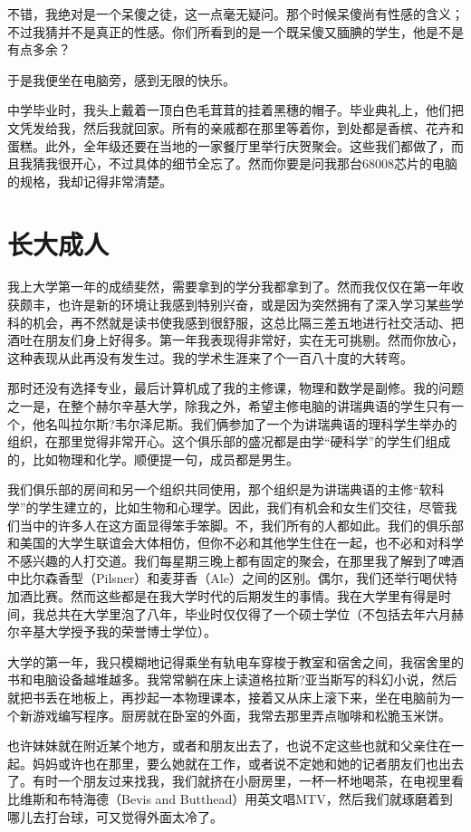 不错，我绝对是一个呆傻之徒，这一点毫无疑问。那个时候呆傻尚有性感的含义；不过我猜并不是真正的性感。你们所看到的是一个既呆傻又腼腆的学生，他是不是有点多余？

于是我便坐在电脑旁，感到无限的快乐。

中学毕业时，我头上戴着一顶白色毛茸茸的挂着黑穗的帽子。毕业典礼上，他们把文凭发给我，然后我就回家。所有的亲戚都在那里等着你，到处都是香槟、花卉和蛋糕。此外，全年级还要在当地的一家餐厅里举行庆贺聚会。这些我们都做了，而且我猜我很开心，不过具体的细节全忘了。然而你要是问我那台68008芯片的电脑的规格，我却记得非常清楚。

 
\section{长大成人}

我上大学第一年的成绩斐然，需要拿到的学分我都拿到了。然而我仅仅在第一年收获颇丰，也许是新的环境让我感到特别兴奋，或是因为突然拥有了深入学习某些学科的机会，再不然就是读书使我感到很舒服，这总比隔三差五地进行社交活动、把酒吐在朋友们身上好得多。第一年我表现得非常好，实在无可挑剔。然而你放心，这种表现从此再没有发生过。我的学术生涯来了个一百八十度的大转弯。

那时还没有选择专业，最后计算机成了我的主修课，物理和数学是副修。我的问题之一是，在整个赫尔辛基大学，除我之外，希望主修电脑的讲瑞典语的学生只有一个，他名叫拉尔斯?韦尔泽尼斯。我们俩参加了一个为讲瑞典语的理科学生举办的组织，在那里觉得非常开心。这个俱乐部的盛况都是由学“硬科学”的学生们组成的，比如物理和化学。顺便提一句，成员都是男生。

我们俱乐部的房间和另一个组织共同使用，那个组织是为讲瑞典语的主修“软科学”的学生建立的，比如生物和心理学。因此，我们有机会和女生们交往，尽管我们当中的许多人在这方面显得笨手笨脚。不，我们所有的人都如此。我们的俱乐部和美国的大学生联谊会大体相仿，但你不必和其他学生住在一起，也不必和对科学不感兴趣的人打交道。我们每星期三晚上都有固定的聚会，在那里我了解到了啤酒中比尔森香型（Pilsner）和麦芽香（Ale）之间的区别。偶尔，我们还举行喝伏特加酒比赛。然而这些都是在我大学时代的后期发生的事情。我在大学里有得是时间，我总共在大学里泡了八年，毕业时仅仅得了一个硕士学位（不包括去年六月赫尔辛基大学授予我的荣誉博士学位）。

大学的第一年，我只模糊地记得乘坐有轨电车穿梭于教室和宿舍之间，我宿舍里的书和电脑设备越堆越多。我常常躺在床上读道格拉斯?亚当斯写的科幻小说，然后就把书丢在地板上，再抄起一本物理课本，接着又从床上滚下来，坐在电脑前为一个新游戏编写程序。厨房就在卧室的外面，我常去那里弄点咖啡和松脆玉米饼。

也许妹妹就在附近某个地方，或者和朋友出去了，也说不定这些也就和父亲住在一起。妈妈或许也在那里，要么她就在工作，或者说不定她和她的记者朋友们也出去了。有时一个朋友过来找我，我们就挤在小厨房里，一杯一杯地喝茶，在电视里看比维斯和布特海德（Bevis and Butthead）用英文唱MTV，然后我们就琢磨着到哪儿去打台球，可又觉得外面太冷了。


